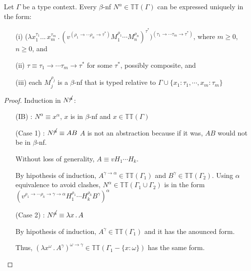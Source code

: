 \documentclass[a4paper,10pt]{article}
\begin{document}
\begin{lem}\label{8A5}
 Let $\Gamma$ be a type context. Every $\beta$-nf $N^{\alpha} \in \mathbb{TT}(\Gamma)$ can be expressed uniquely in the form:
 
\begin{itemize}
 \item[(i)] ($\lambda x_1^{\tau_1} ... \,x_m^{\tau_m} \, . \,
   (v^{(\rho_1 \rightarrow \cdots \rho_n \rightarrow \tau^*)} M^{\rho_1}_1 \cdots
   M^{\rho_n}_n)^{\tau^*})^{(\tau_1 \rightarrow \cdots \tau_m \rightarrow \tau^*)}$, where $m \geq 0$, $n \geq 0$, and

 \item[(ii)] $ \tau \equiv \tau_1 \rightarrow \cdots \tau_m \rightarrow \tau^*$ for some $\tau^*$, possibly composite, and 

 \item[(iii)] each $M^{\rho_j}_j$ is a $\beta$-nf that is typed relative to  $\Gamma \cup \{x_1 : \tau_1,\cdots, x_m : \tau_m\}$
\end{itemize}

\begin{proof}
Induction in $N^{\cancel{\alpha}}$:

\begin{itemize}
 \item[(IB)] : $N^{\alpha} \equiv x^{\alpha}$, $x$ is in $\beta$-nf and $x \in \mathbb{TT}(\Gamma)$
 \item[(Case 1)] : $N^{\cancel{\alpha}} \equiv A B$
 $A$ is not an abstraction because if it was, $A B$ would not be in $\beta$-nf. 
 
 Without loss of generality, $A \equiv v H_1 \cdots H_k$. 
 
 By hipothesis of induction, $A^{\gamma \rightarrow \alpha} \in \mathbb{TT}(\Gamma_1)$ and $B^{\gamma} \in \mathbb{TT}(\Gamma_2)$. Using $\alpha$ equivalence to avoid clashes,
 $N^{\alpha} \in \mathbb{TT}(\Gamma_1 \cup \Gamma_2)$ is in the form
 $(v^{\rho_1\rightarrow \cdots \rho_k \rightarrow \gamma \rightarrow \alpha} H^{\rho_1}_1 \cdots
 H^{\rho_k}_k B^{\gamma})^{\alpha}$
 
 \item[(Case 2)] : $N^{\cancel{\alpha}} \equiv \lambda x \, . \, A$
 
 By hipothesis of induction, $A^{\gamma} \in \mathbb{TT}(\Gamma_1)$ and
it has the anounced form. 

Thus, $(\lambda x^{\omega}\, . \,
A^{\gamma})^{\omega \rightarrow \gamma} \in \mathbb{TT}(\Gamma_1 - \{x:
\omega\})$ has the same form.
\end{itemize}
\end{proof}
\end{lem}
\end{document}
